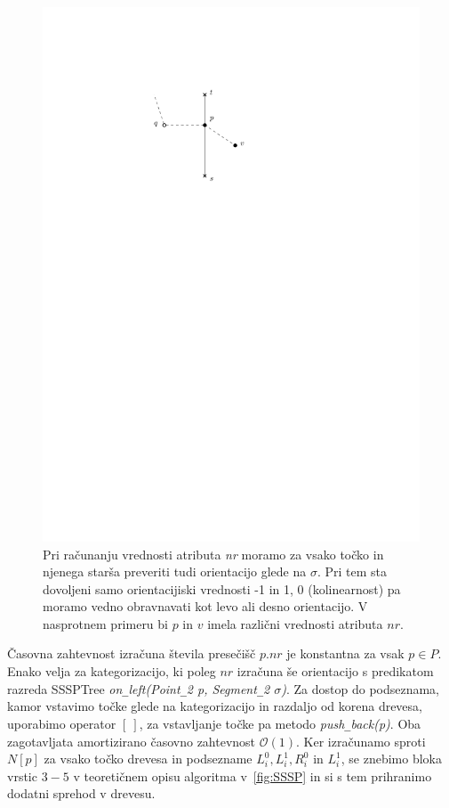 \documentclass[a4paper, 12pt]{book}
\newcommand{\OO}{\ensuremath{\mathcal{O}}} %
\newcommand{\U}{\texttt{\_}}
\begin{document}
\begin{figure}[htp]
\centerline{\includegraphics[scale=1]{pics/nrSideExample.pdf}}
\caption{Pri računanju vrednosti atributa \textit{nr} moramo za vsako točko in njenega starša preveriti tudi orientacijo glede na $\sigma$. Pri tem sta dovoljeni samo orientacijiski vrednosti -1 in 1, 0 (kolinearnost) pa moramo vedno obravnavati kot levo ali desno orientacijo. V nasprotnem primeru bi $p$ in $v$ imela različni vrednosti atributa $nr$.}
\label{pq-left-right}
\end{figure}

Časovna zahtevnost izračuna števila presečišč $p.nr$ je konstantna za vsak $p\in P$. Enako velja za kategorizacijo, ki poleg $nr$ izračuna še orientacijo s predikatom razreda SSSPTree \textit{on\U left(Point\U 2 p, Segment\U 2 $\sigma$)}. Za dostop do podseznama, kamor vstavimo točke glede na kategorizacijo in razdaljo od korena drevesa, uporabimo operator $[\ ]$, za vstavljanje točke pa metodo \textit{push\U back(p)}. Oba zagotavljata amortizirano časovno zahtevnost $\OO(1)$. Ker izračunamo sproti $N[p]$ za vsako točko drevesa in podsezname $L_i^0, L_i^1, R_i^0$ in $L_i^1$, se znebimo bloka vrstic $3-5$ v teoretičnem opisu algoritma v~\ref{fig:SSSP} in si s tem prihranimo dodatni sprehod v drevesu.
\end{document}
